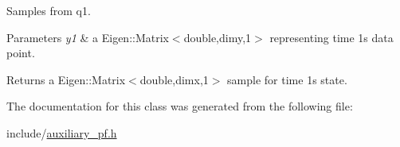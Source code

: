 Samples from q1. 


\begin{DoxyParams}{Parameters}
{\em y1} & a Eigen\+::\+Matrix$<$double,dimy,1$>$ representing time 1\textquotesingle{}s data point. \\
\hline
\end{DoxyParams}
\begin{DoxyReturn}{Returns}
a Eigen\+::\+Matrix$<$double,dimx,1$>$ sample for time 1\textquotesingle{}s state. 
\end{DoxyReturn}


The documentation for this class was generated from the following file\+:\begin{DoxyCompactItemize}
\item 
include/\hyperlink{auxiliary__pf_8h}{auxiliary\+\_\+pf.\+h}\end{DoxyCompactItemize}
